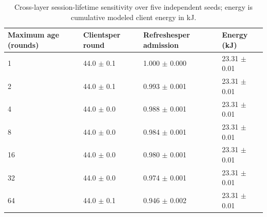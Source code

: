 \begin{table}[!ht]
\caption{Cross-layer session-lifetime sensitivity over five independent seeds; energy is cumulative modeled client energy in kJ.}
\label{tab:session-sensitivity}
\centering
\setlength{\tabcolsep}{2pt}
\begin{tabular}{|p{}|p{}|p{}|p{}|}
\hline
Maximum age (rounds) & Clients\newline{}per round & Refreshes\newline{}per admission & Energy (kJ) \\
\hline
1 & 44.0 $\pm$ 0.1 & 1.000 $\pm$ 0.000 & 23.31 $\pm$ 0.01 \\
\hline
2 & 44.0 $\pm$ 0.1 & 0.993 $\pm$ 0.001 & 23.31 $\pm$ 0.01 \\
\hline
4 & 44.0 $\pm$ 0.0 & 0.988 $\pm$ 0.001 & 23.31 $\pm$ 0.01 \\
\hline
8 & 44.0 $\pm$ 0.0 & 0.984 $\pm$ 0.001 & 23.31 $\pm$ 0.01 \\
\hline
16 & 44.0 $\pm$ 0.0 & 0.980 $\pm$ 0.001 & 23.31 $\pm$ 0.01 \\
\hline
32 & 44.0 $\pm$ 0.0 & 0.974 $\pm$ 0.001 & 23.31 $\pm$ 0.01 \\
\hline
64 & 44.0 $\pm$ 0.1 & 0.946 $\pm$ 0.002 & 23.31 $\pm$ 0.01 \\
\hline
\end{tabular}
\end{table}
